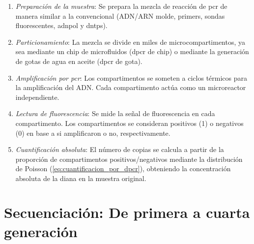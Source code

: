 \documentclass{AsignaturaResumen}
\begin{document}
\begin{enumerate}
    \item \emph{Preparación de la muestra}: Se prepara la mezcla de reacción de \acrshort{pcr} de manera similar a la convencional (ADN/ARN molde, primers, sondas fluorescentes, \acrshort{adnpol} y \acrshort{dntps}).
    \item \emph{Particionamiento}: La mezcla se divide en miles de microcompartimentos, ya sea mediante un chip de microfluidos (\acrshort{dpcr} de chip) o mediante la generación de gotas de agua en aceite (\acrshort{dpcr} de gota).
    \item \emph{Amplificación por \acrshort{pcr}}: Los compartimentos se someten a ciclos térmicos para la amplificación del ADN. Cada compartimento actúa como un microreactor independiente.
    \item \emph{Lectura de fluorescencia}: Se mide la señal de fluorescencia en cada compartimento. Los compartimentos se consideran positivos (1) o negativos (0) en base a si amplificaron o no, respectivamente.
    \item \emph{Cuantificación absoluta}: El número de copias se calcula a partir de la proporción de compartimentos positivos/negativos mediante la distribución de Poisson (\autoref{eq:cuantificacion_por_dpcr}), obteniendo la concentración absoluta de la diana en la muestra original.
\end{enumerate}


    




\section[Secuenciación]{Secuenciación: De primera a cuarta generación}
\end{document}
